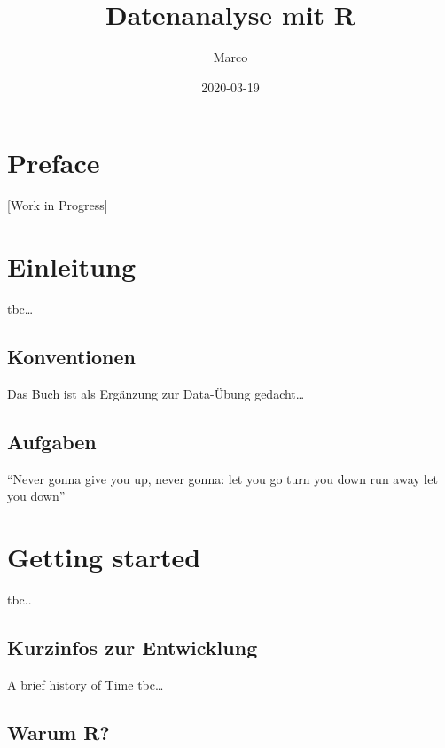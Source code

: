 \documentclass[
]{book}
\title{Datenanalyse mit R}
\author{Marco}
\date{2020-03-19}
\begin{document}
\maketitle

{
\setcounter{tocdepth}{1}
\tableofcontents
}
\hypertarget{preface}{%
\chapter*{Preface}\label{preface}}

{[}Work in Progress{]}

\hypertarget{einleitung}{%
\chapter*{Einleitung}\label{einleitung}}

tbc\ldots{}

\hypertarget{konventionen}{%
\section*{Konventionen}\label{konventionen}}

Das Buch ist als Ergänzung zur Data-Übung gedacht\ldots{}

\hypertarget{aufgaben}{%
\section{Aufgaben}\label{aufgaben}}

``Never gonna give you up, never gonna: let you go turn you down run away let you down''

\hypertarget{start}{%
\chapter{Getting started}\label{start}}

tbc..

\hypertarget{kurzinfos-zur-entwicklung}{%
\section{Kurzinfos zur Entwicklung}\label{kurzinfos-zur-entwicklung}}

A brief history of Time tbc\ldots{}

\hypertarget{warum-r}{%
\section{Warum R?}\label{warum-r}}
\end{document}
